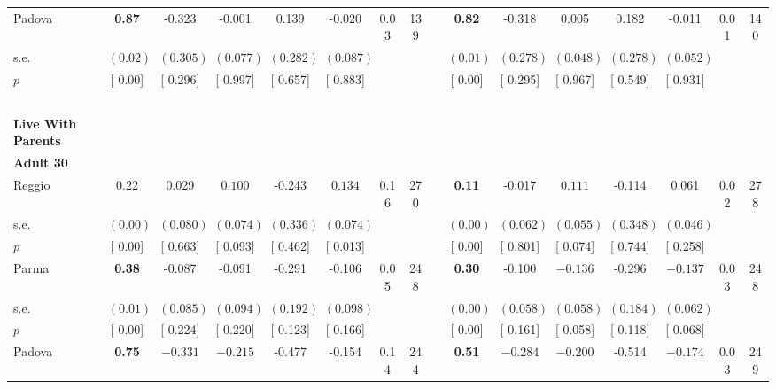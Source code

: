 \begin{longtable}{L{8em} c c c c c c c p{1em} c c c c c c c}
\quad \quad \quad Padova& \textbf{     0.87} &    -0.323 &    -0.001 &     0.139 &    -0.020 &      0.03 &       139 & & \textbf{     0.82} &    -0.318 &     0.005 &     0.182 &    -0.011 &      0.01 &       140  \\*
\quad \quad \quad \quad s.e.& $ (     0.02)$ & $ (    0.305)$ & $ (    0.077)$ & $ (    0.282)$ & $ (    0.087)$ & & & & $ (     0.01)$ & $ (    0.278)$ & $ (    0.048)$ & $ (    0.278)$ & $ (    0.052)$ & &  \\*
\quad \quad \quad \quad $ p$ & [     0.00] & [    0.296] & [    0.997] & [    0.657] & [    0.883] & & & & [     0.00] & [    0.295] & [    0.967] & [    0.549] & [    0.931] & &  \\[1em]
~\\[1em]
\textbf{Live With Parents} \\*
\quad \quad \textbf{Adult 30} & & & & & & & & & & & & & & & \\* 
\quad \quad \quad Reggio& 0.22 &     0.029 & $ \mathbf{    0.100}$ &    -0.243 & $ \mathbf{    0.134}$ &      0.16 &       270 & & \textbf{     0.11} &    -0.017 & $ \mathbf{    0.111}$ &    -0.114 &     0.061 &      0.02 &       278  \\*
\quad \quad \quad \quad s.e.& $ (     0.00)$ & $ (    0.080)$ & $ (    0.074)$ & $ (    0.336)$ & $ (    0.074)$ & & & & $ (     0.00)$ & $ (    0.062)$ & $ (    0.055)$ & $ (    0.348)$ & $ (    0.046)$ & &  \\*
\quad \quad \quad \quad $ p$ & [     0.00] & [    0.663] & [    0.093] & [    0.462] & [    0.013] & & & & [     0.00] & [    0.801] & [    0.074] & [    0.744] & [    0.258] & &  \\[1em]
\quad \quad \quad Parma& \textbf{     0.38} &    -0.087 &    -0.091 &    -0.291 &    -0.106 &      0.05 &       248 & & \textbf{     0.30} &    -0.100 & $ \mathbf{   -0.136}$ &    -0.296 & $ \mathbf{   -0.137}$ &      0.03 &       248  \\*
\quad \quad \quad \quad s.e.& $ (     0.01)$ & $ (    0.085)$ & $ (    0.094)$ & $ (    0.192)$ & $ (    0.098)$ & & & & $ (     0.00)$ & $ (    0.058)$ & $ (    0.058)$ & $ (    0.184)$ & $ (    0.062)$ & &  \\*
\quad \quad \quad \quad $ p$ & [     0.00] & [    0.224] & [    0.220] & [    0.123] & [    0.166] & & & & [     0.00] & [    0.161] & [    0.058] & [    0.118] & [    0.068] & &  \\[1em]
\quad \quad \quad Padova& \textbf{     0.75} & $ \mathbf{   -0.331}$ & $ \mathbf{   -0.215}$ &    -0.477 &    -0.154 &      0.14 &       244 & & \textbf{     0.51} & $ \mathbf{   -0.284}$ & $ \mathbf{   -0.200}$ &    -0.514 & $ \mathbf{   -0.174}$ &      0.03 &       249  \\*

\end{longtable}
